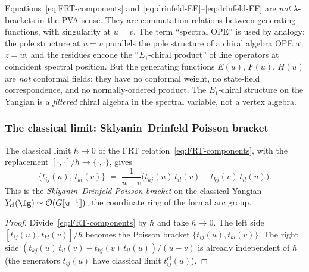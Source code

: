 \begin{remark}
Equations~\eqref{eq:FRT-components}
and~\eqref{eq:drinfeld-EE}--\eqref{eq:drinfeld-EF} are
\emph{not} $\lambda$-brackets in the PVA sense. They are
commutation relations between generating functions, with
singularity at $u = v$. The term ``spectral OPE'' is used
by analogy: the pole structure at $u = v$ parallels the pole
structure of a chiral algebra OPE at $z = w$, and the
residues encode the ``$E_1$-chiral product'' of line operators
at coincident spectral position. But the generating functions
$E(u)$, $F(u)$, $H(u)$ are \emph{not} conformal fields: they
have no conformal weight, no state-field correspondence, and
no normally-ordered product. The $E_1$-chiral structure on the
Yangian is a \emph{filtered} chiral algebra in the spectral
variable, not a vertex algebra.
\end{remark}

\subsubsection*{The classical limit: Sklyanin--Drinfeld Poisson
bracket}

\begin{proposition}
The classical limit $\hbar \to 0$ of the FRT
relation~\eqref{eq:FRT-components}, with the replacement
$[\cdot, \cdot]/\hbar \to \{\cdot, \cdot\}$, gives
\begin{equation}%
\{t_{ij}(u),\, t_{kl}(v)\}
\;=\;
\frac{1}{u - v}\bigl(
 t_{kj}(u)\,t_{il}(v) - t_{kj}(v)\,t_{il}(u)
\bigr).
\end{equation}
This is the \emph{Sklyanin--Drinfeld Poisson bracket} on the
classical Yangian $Y_{\mathrm{cl}}(\fg) \simeq
\mathcal{O}(G[\![u^{-1}]\!])$, the coordinate ring of the
formal arc group.
\end{proposition}

\begin{proof}
Divide~\eqref{eq:FRT-components} by $\hbar$ and take
$\hbar \to 0$. The left side
$[t_{ij}(u), t_{kl}(v)]/\hbar$ becomes the Poisson bracket
$\{t_{ij}(u), t_{kl}(v)\}$. The right side
$(t_{kj}(u)\,t_{il}(v) - t_{kj}(v)\,t_{il}(u))/(u-v)$
is already independent of $\hbar$ (the generators $t_{ij}(u)$
have classical limit $t_{ij}^{\mathrm{cl}}(u)$).
\end{proof}

